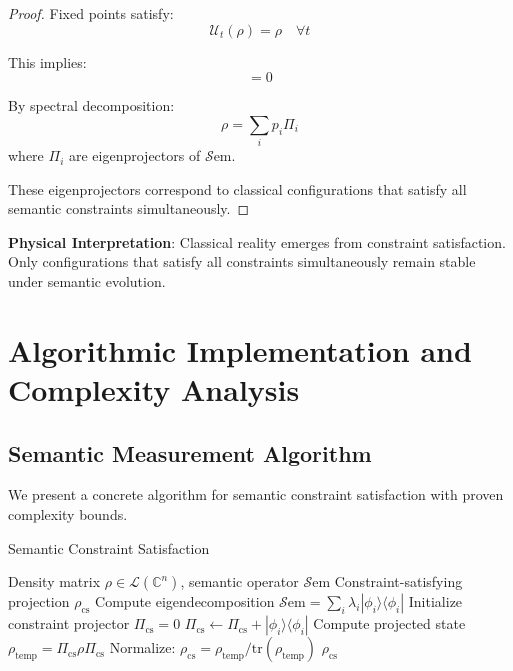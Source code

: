 \documentclass[11pt]{article}
\theoremstyle{definition}
\newcommand{\Sem}{\mathcal{S}\text{em}}
\newcommand{\tr}{\text{tr}}
\begin{document}
\begin{proof}
Fixed points satisfy:
\begin{equation}
\mathcal{U}_t(\rho) = \rho \quad \forall t
\end{equation}

This implies:
\begin{equation}
[\rho, \Sem] = 0
\end{equation}

By spectral decomposition:
\begin{equation}
\rho = \sum_i p_i \Pi_i
\end{equation}
where $\Pi_i$ are eigenprojectors of $\Sem$.

These eigenprojectors correspond to classical configurations that satisfy all semantic constraints simultaneously.
\end{proof}

\textbf{Physical Interpretation}: Classical reality emerges from constraint satisfaction. Only configurations that satisfy all constraints simultaneously remain stable under semantic evolution.

\section{Algorithmic Implementation and Complexity Analysis}

\subsection{Semantic Measurement Algorithm}

We present a concrete algorithm for semantic constraint satisfaction with proven complexity bounds.

\begin{algorithm}
\caption{Semantic Constraint Satisfaction}
\begin{algorithmic}[1]
\REQUIRE Density matrix $\rho \in \mathcal{L}(\mathbb{C}^n)$, semantic operator $\Sem$
\ENSURE Constraint-satisfying projection $\rho_{\text{cs}}$
\STATE Compute eigendecomposition $\Sem = \sum_i \lambda_i |\phi_i\rangle\langle\phi_i|$
\STATE Initialize constraint projector $\Pi_{\text{cs}} = 0$
        \STATE $\Pi_{\text{cs}} \leftarrow \Pi_{\text{cs}} + |\phi_i\rangle\langle\phi_i|$
    \ENDIF
\ENDFOR
\STATE Compute projected state $\rho_{\text{temp}} = \Pi_{\text{cs}} \rho \Pi_{\text{cs}}$
\STATE Normalize: $\rho_{\text{cs}} = \rho_{\text{temp}} / \tr(\rho_{\text{temp}})$
\RETURN $\rho_{\text{cs}}$
\end{algorithmic}
\end{algorithm}
\end{document}
